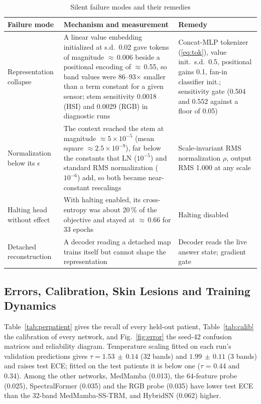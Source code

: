 \documentclass{svproc}
\newcommand{\ms}{\ensuremath{\,\pm\,}}   %
\begin{document}
\begin{table}[!htb]
\caption{Silent failure modes and their remedies}
\label{tab:safeguards}
\centering\scriptsize
\begin{tabular}{@{}L{1.9cm}L{5.8cm}L{3.5cm}@{}}
\toprule
Failure mode & Mechanism and measurement & Remedy \\
\midrule
Representation collapse & A linear value embedding initialized at s.d.\ 0.02 gave tokens of magnitude $\approx$\,0.006 beside a positional encoding of $\approx$\,0.55, so band values were 86--93$\times$ smaller than a term constant for a given sensor; stem sensitivity 0.0018 (HSI) and 0.0029 (RGB) in diagnostic runs & Concat-MLP tokenizer (\ref{eq:tok}), value init.\ s.d.\ 0.5, positional gains 0.1, fan-in classifier init.; sensitivity gate (0.504 and 0.552 against a floor of 0.05) \\
Normalization below its $\epsilon$ & The context reached the stem at magnitude $\approx 5 \times 10^{-5}$ (mean square $\approx 2.5 \times 10^{-9}$), far below the constants that LN ($10^{-5}$) and standard RMS normalization ($10^{-6}$) add, so both became near-constant rescalings & Scale-invariant RMS normalization $\rho$, output RMS 1.000 at any scale \\
Halting head without effect & With halting enabled, its cross-entropy was about 20\,\% of the objective and stayed at $\approx$\,0.66 for 33 epochs & Halting disabled \\
Detached reconstruction & A decoder reading a detached map trains itself but cannot shape the representation & Decoder reads the live answer state; gradient gate \\
\bottomrule
\end{tabular}
\end{table}

\subsection{Errors, Calibration, Skin Lesions and Training Dynamics}
Table~\ref{tab:perpatient} gives the recall of every held-out patient, Table~\ref{tab:calib} the calibration of every network, and Fig.~\ref{fig:error} the seed-42 confusion matrices and reliability diagram. Temperature scaling fitted on each run's validation predictions gives $\tau = 1.53\ms0.14$ (32 bands) and $1.99\ms0.11$ (3 bands) and raises test ECE; fitted on the test patients it is below one ($\tau$ = 0.44 and 0.34). Among the other networks, MedMamba (0.013), the 64-feature probe (0.025), SpectralFormer (0.035) and the RGB probe (0.035) have lower test ECE than the 32-band MedMamba-SS-TRM, and HybridSN (0.062) higher.
\end{document}
